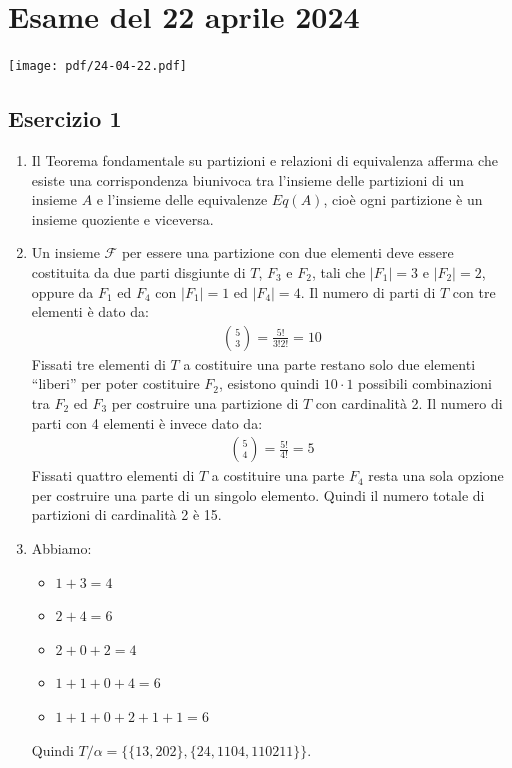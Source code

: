 \section{Esame del 22 aprile 2024}
\begin{center}
	\texttt{[image: pdf/24-04-22.pdf]}
\end{center}
\subsection*{Esercizio 1}
\begin{enumerate}[label=(\textit{\roman*})]
	\item Il Teorema fondamentale su partizioni e relazioni di equivalenza afferma che esiste una corrispondenza biunivoca tra l'insieme delle partizioni di un insieme $A$ e l'insieme delle equivalenze $Eq(A)$, cioè ogni partizione è un insieme quoziente e viceversa.
	\item Un insieme $\mathcal{F}$ per essere una partizione con due elementi deve essere costituita da due parti disgiunte di $T$, $F_{3}$ e $F_{2}$, tali che $|F_{1}|=3$ e $|F_{2}|=2$, oppure da $F_{1}$ ed $F_{4}$ con $|F_{1}|=1$ ed $|F_{4}|=4$. Il numero di parti di $T$ con tre elementi è dato da:
	\begin{align*}
		\binom{5}{3} = \frac{5!}{3!2!} = 10
	\end{align*}
Fissati tre elementi di $T$ a costituire una parte restano solo due elementi ``liberi'' per poter costituire $F_{2}$, esistono quindi $10 \cdot 1$ possibili combinazioni tra $F_{2}$ ed $F_{3}$ per costruire una partizione di $T$ con cardinalità 2. Il numero di parti con 4 elementi è invece dato da:
\begin{align*}
	\binom{5}{4} = \frac{5!}{4!}= 5
\end{align*}
Fissati quattro elementi di $T$ a costituire una parte $F_{4}$ resta una sola opzione per costruire una parte di un singolo elemento. Quindi il numero totale di partizioni di cardinalità 2 è 15.
\item Abbiamo:
\begin{itemize}
	\item $1+3=4$
	\item $2+4=6$
	\item $2+0+2=4$
	\item $1+1+0+4=6$
	\item $1+1+0+2+1+1=6$
\end{itemize}
Quindi $T/{\alpha}=\{\{13,202\},\{24,1104,110211\}\}$.
	\end{enumerate}
